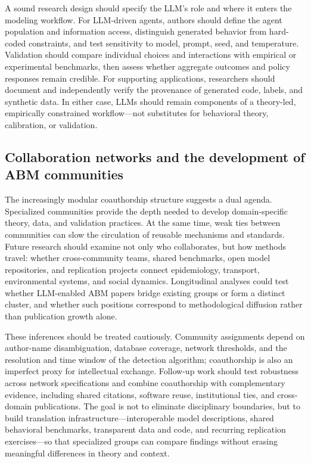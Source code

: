A sound research design should specify the LLM’s role and where it enters the modeling workflow. For LLM-driven agents, authors should define the agent population and information access, distinguish generated behavior from hard-coded constraints, and test sensitivity to model, prompt, seed, and temperature. Validation should compare individual choices and interactions with empirical or experimental benchmarks, then assess whether aggregate outcomes and policy responses remain credible. For supporting applications, researchers should document and independently verify the provenance of generated code, labels, and synthetic data. In either case, LLMs should remain components of a theory-led, empirically constrained workflow—not substitutes for behavioral theory, calibration, or validation.

\subsection{Collaboration networks and the development of ABM communities}

The increasingly modular coauthorship structure suggests a dual agenda. Specialized communities provide the depth needed to develop domain-specific theory, data, and validation practices. At the same time, weak ties between communities can slow the circulation of reusable mechanisms and standards. Future research should examine not only who collaborates, but how methods travel: whether cross-community teams, shared benchmarks, open model repositories, and replication projects connect epidemiology, transport, environmental systems, and social dynamics. Longitudinal analyses could test whether LLM-enabled ABM papers bridge existing groups or form a distinct cluster, and whether such positions correspond to methodological diffusion rather than publication growth alone.

These inferences should be treated cautiously. Community assignments depend on author-name disambiguation, database coverage, network thresholds, and the resolution and time window of the detection algorithm; coauthorship is also an imperfect proxy for intellectual exchange. Follow-up work should test robustness across network specifications and combine coauthorship with complementary evidence, including shared citations, software reuse, institutional ties, and cross-domain publications. The goal is not to eliminate disciplinary boundaries, but to build translation infrastructure—interoperable model descriptions, shared behavioral benchmarks, transparent data and code, and recurring replication exercises—so that specialized groups can compare findings without erasing meaningful differences in theory and context.